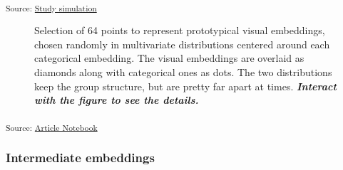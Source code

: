 \documentclass[
  authoryear]{elsarticle}
\begin{document}
\textsubscript{Source:
\href{https://m-delem.github.io/2499-similarity-manuscript/notebooks/simulation-code-preview.html\#cell-visual-embeddings}{Study
simulation}}

\label{cell-fig-visual-embeddings}
\begin{figure}[H]


\caption{\label{fig-visual-embeddings}Selection of 64 points to
represent prototypical visual embeddings, chosen randomly in
multivariate distributions centered around each categorical embedding.
The visual embeddings are overlaid as diamonds along with categorical
ones as dots. The two distributions keep the group structure, but are
pretty far apart at times. \textbf{\emph{Interact with the figure to see
the details.}}}

\end{figure}%

\textsubscript{Source:
\href{https://m-delem.github.io/2499-similarity-manuscript/index.qmd.html}{Article
Notebook}}

\subsubsection{Intermediate embeddings}\label{intermediate-embeddings}
\end{document}
